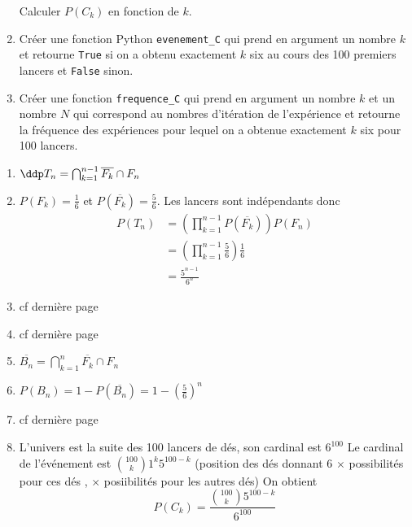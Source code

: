 \begin{exercice}
\begin{enumerate}
 Calculer $P(C_k)$ en fonction de $k$. 
\item Créer une fonction Python \texttt{evenement\_C} qui prend en argument un nombre $k$ et retourne \texttt{True} si on a obtenu exactement $k$ six au cours des 100 premiers lancers et \texttt{False} sinon. 
\item Créer une fonction \texttt{frequence\_C} qui prend en argument un nombre $k$ et un nombre $N$ qui correspond au nombres d'itération de l'expérience et  retourne la fréquence des expériences pour lequel on a obtenue exactement $k$ six pour 100 lancers. 

\end{enumerate}

\end{exercice}


\begin{correction}
\begin{enumerate}
\item $\ddp T_n = \bigcap_{k=1}^{n-1} \overline{F_k}  \cap F_n$
\item $P(F_k) = \frac{1}{6}$  et $P( \overline{F_k}) = \frac{5}{6}$. Les lancers sont indépendants donc 
\begin{align*}
P(T_n) &= \left(\prod_{k=1}^{n-1}  P( \overline{F_k} )\right) P (F_n)\\
&= \left(\prod_{k=1}^{n-1}  \frac{5}{6}\right) \frac{1}{6}\\
&= \frac{5^{n-1}}{6^n}
\end{align*}
\item cf dernière page
\item cf dernière page
\item $\overline{B_n} = \bigcap_{k=1}^{n} \overline{F_k}  \cap F_n$
\item $P(B_n) = 1- P(\overline{B_n} ) = 1- \left(\frac{5}{6}\right)^n$
\item cf dernière page
\item L'univers est la suite des 100 lancers de dés, son cardinal est $6^{100}$ 
Le cardinal de l'événement  est $\binom{100}{k}1^k 5^{100-k}$ (position des dés donnant 6 $\times$ possibilités pour 
 ces dés  , $\times $ posiibilités pour les autres dés)
 On obtient 
 $$P(C_k)  =\frac{\binom{100}{k} 5^{100-k}}{6^{100}}$$

\end{enumerate}
\end{correction}